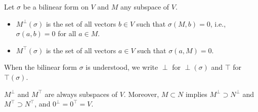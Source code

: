 Let $\sigma$ be a bilinear form on $V$ and $M$ any subspace of $V$.

\begin{itemize}
\item $M^{\perp}(\sigma)$ is the set of all vectors $b \in V$ such that $\sigma(M, b) = 0$, i.e., $\sigma(a, b) = 0$ for all $a \in M$.
\item $M^{\top}(\sigma)$ is the set of all vectors $a \in V$ such that $\sigma(a, M) = 0$.
\end{itemize}

When the bilinear form $\sigma$ is understood, we write $\perp$ for $\perp(\sigma)$ and $\top$ for $\top(\sigma)$.

$M^{\perp}$ and $M^{\top}$ are always subspaces of $V$. Moreover, $M \subset N$ implies $M^{\perp} \supset N^{\perp}$ and $M^{\top} \supset N^{\top}$, and $0^{\perp} = 0^{\top} = V$.
